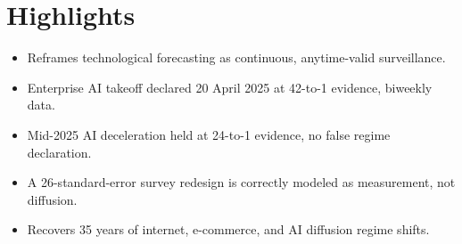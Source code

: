 \documentclass{article}
\begin{document}
\section*{Highlights}
\begin{itemize}
\item Reframes technological forecasting as continuous, anytime-valid surveillance.
\item Enterprise AI takeoff declared 20 April 2025 at 42-to-1 evidence, biweekly data.
\item Mid-2025 AI deceleration held at 24-to-1 evidence, no false regime declaration.
\item A 26-standard-error survey redesign is correctly modeled as measurement, not diffusion.
\item Recovers 35 years of internet, e-commerce, and AI diffusion regime shifts.
\end{itemize}
\end{document}
